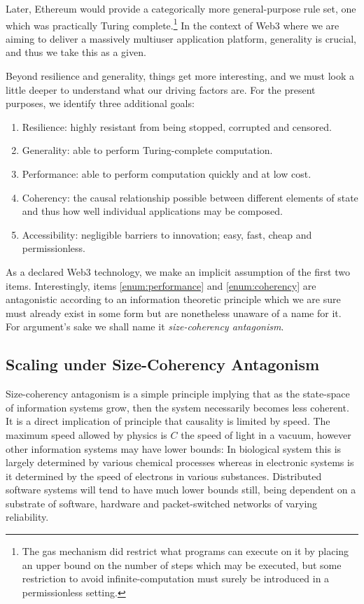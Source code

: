 Later, Ethereum would provide a categorically more general-purpose rule set, one which was practically Turing complete.\footnote{The gas mechanism did restrict what programs can execute on it by placing an upper bound on the number of steps which may be executed, but some restriction to avoid infinite-computation must surely be introduced in a permissionless setting.} In the context of Web3 where we are aiming to deliver a massively multiuser application platform, generality is crucial, and thus we take this as a given.

Beyond resilience and generality, things get more interesting, and we must look a little deeper to understand what our driving factors are. For the present purposes, we identify three additional goals:
\begin{enumerate}
  \item \label{enum:resilience} Resilience: highly resistant from being stopped, corrupted and censored.
  \item \label{enum:generality} Generality: able to perform Turing-complete computation.
  \item \label{enum:performance} Performance: able to perform computation quickly and at low cost.
  \item \label{enum:coherency} Coherency: the causal relationship possible between different elements of state and thus how well individual applications may be composed.
  \item \label{enum:accessibility} Accessibility: negligible barriers to innovation; easy, fast, cheap and permissionless.
\end{enumerate}

As a declared Web3 technology, we make an implicit assumption of the first two items. Interestingly, items \ref{enum:performance} and \ref{enum:coherency} are antagonistic according to an information theoretic principle which we are sure must already exist in some form but are nonetheless unaware of a name for it. For argument's sake we shall name it \emph{size-coherency antagonism}.

\subsection{Scaling under Size-Coherency Antagonism}

Size-coherency antagonism is a simple principle implying that as the state-space of information systems grow, then the system necessarily becomes less coherent. It is a direct implication of principle that causality is limited by speed. The maximum speed allowed by physics is $C$ the speed of light in a vacuum, however other information systems may have lower bounds: In biological system this is largely determined by various chemical processes whereas in electronic systems is it determined by the speed of electrons in various substances. Distributed software systems will tend to have much lower bounds still, being dependent on a substrate of software, hardware and packet-switched networks of varying reliability.


